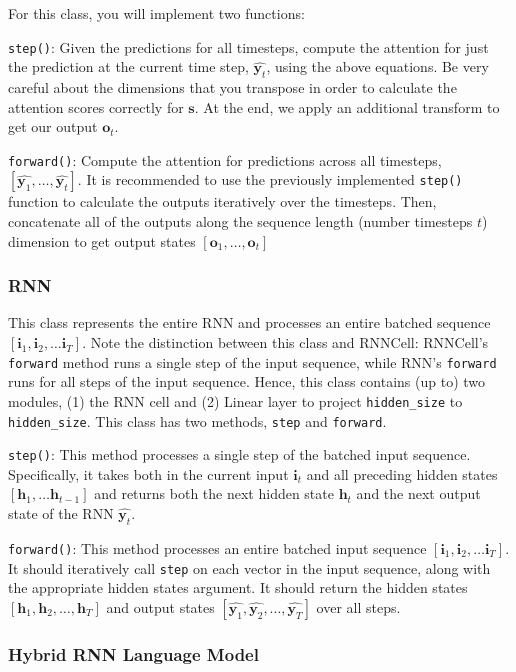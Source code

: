 \documentclass[11pt,addpoints,answers]{exam}
\newcommand{\hv}{\mathbf{h}}
\newcommand{\iv}{\mathbf{i}}
\newcommand{\ov}{\mathbf{o}}
\newcommand{\sv}{\mathbf{s}}
\newcommand{\yv}{\mathbf{y}}
\begin{document}
For this class, you will implement two functions:

\texttt{step()}: Given the predictions for all timesteps, compute the attention for just the prediction at the current time step, $\hat{\yv_t}$, using the above equations. Be very careful about the dimensions that you transpose in order to calculate the attention scores correctly for $\sv$. At the end, we apply an additional transform to get our output $\ov_t$.

\texttt{forward()}: Compute the attention for predictions across all timesteps, $[\hat{\yv_1}, \ldots, \hat{\yv_t}]$. It is recommended to use the previously implemented \texttt{step()} function to calculate the outputs iteratively over the timesteps. Then, concatenate all of the outputs along the sequence length (number timesteps $t$) dimension to get output states $[\ov_1, \ldots, \ov_t]$

\subsubsection{RNN}

This class represents the entire RNN and processes an entire batched sequence $[\iv_1, \iv_2, \ldots \iv_T]$. Note the distinction between this class and RNNCell: RNNCell's \texttt{forward} method runs a single step of the input sequence, while RNN's \texttt{forward} runs for all steps of the input sequence. Hence, this class contains (up to) two modules, (1) the RNN cell and (2) Linear layer to project \texttt{hidden\_size} to \texttt{hidden\_size}. This class has two methods, \texttt{step} and \texttt{forward}.

\texttt{step()}: This method processes a single step of the batched input sequence. Specifically, it takes both in the current input $\iv_t$ and all preceding hidden states $[\hv_1, \ldots \hv_{t-1}]$ and returns both the next hidden state $\hv_t$ and the next output state of the RNN $\hat{\yv_t}$. 

\texttt{forward()}: This method processes an entire batched input sequence $[\iv_1, \iv_2, \ldots \iv_T]$. It should iteratively call \texttt{step} on each vector in the input sequence, along with the appropriate hidden states argument. It should return the hidden states $[\hv_1, \hv_2, \ldots, \hv_T]$ and output states $[\hat{\yv_1}, \hat{\yv_2}, \ldots, \hat{\yv_T}]$ over all steps.


\subsubsection{Hybrid RNN Language Model}
\end{document}

